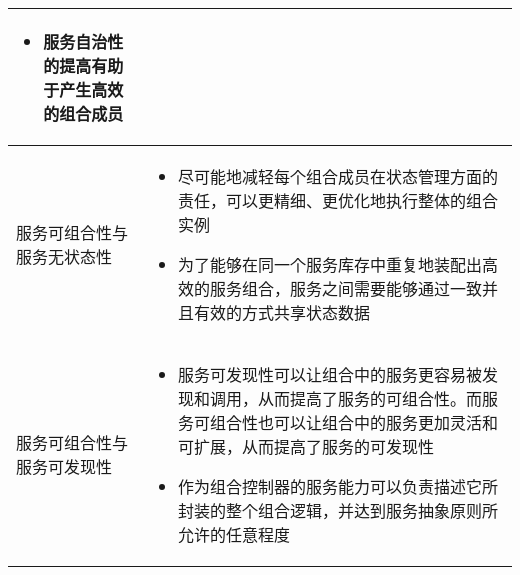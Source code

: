 \begin{longtable}{|m{3cm}<{\centering}|m{12cm}|}
\begin{itemize}[leftmargin=1.5em,itemsep=-3pt,topsep=-3pt]
        \item 服务自治性的提高有助于产生高效的组合成员
    \vspace{-1.5em}
    \end{itemize}  
    \\ \hline
    服务可组合性与服务无状态性
    & 
    \vspace{-1.3em}
    \begin{itemize}[leftmargin=1.5em,itemsep=-3pt,topsep=-3pt]
        \item 尽可能地减轻每个组合成员在状态管理方面的责任，可以更精细、更优化地执行整体的组合实例
        \item 为了能够在同一个服务库存中重复地装配出高效的服务组合，服务之间需要能够通过一致并且有效的方式共享状态数据 
    \vspace{-1.5em}
    \end{itemize}  
    \\ \hline
    服务可组合性与服务可发现性
    & 
    \vspace{-1.3em}
    \begin{itemize}[leftmargin=1.5em,itemsep=-3pt,topsep=-3pt]
        \item 服务可发现性可以让组合中的服务更容易被发现和调用，从而提高了服务的可组合性。而服务可组合性也可以让组合中的服务更加灵活和可扩展，从而提高了服务的可发现性
        \item 作为组合控制器的服务能力可以负责描述它所封装的整个组合逻辑，并达到服务抽象原则所允许的任意程度
    \vspace{-1.5em}
    \end{itemize}  
    \\ \hline
\end{longtable}

